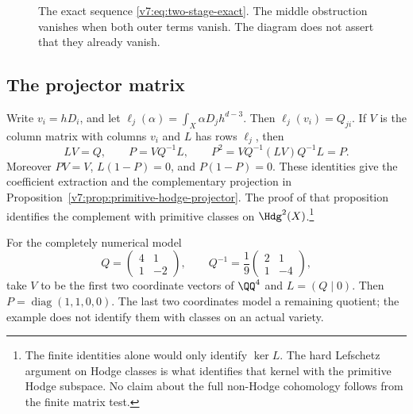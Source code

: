 \begin{figure}[ht]
\centering
{}
\caption{The exact sequence \eqref{v7:eq:two-stage-exact}.
The middle obstruction vanishes when both outer terms vanish.
The diagram does not assert that they already vanish.}
\label{v7:fig:two-defects}
\end{figure}

\subsection{The projector matrix}

Write \(v_i=hD_i\), and let
\(\ell_j(\alpha)=\int_X\alpha D_jh^{d-3}\). Then
\(\ell_j(v_i)=Q_{ji}\). If \(V\) is the column matrix with
columns \(v_i\) and \(L\) has rows \(\ell_j\), then
\[
 LV=Q,\qquad P=VQ^{-1}L,\qquad
 P^2=VQ^{-1}(LV)Q^{-1}L=P.
\]
Moreover \(PV=V\), \(L(1-P)=0\), and \(P(1-P)=0\).
These identities give the coefficient extraction and the complementary
projection in Proposition~\ref{v7:prop:primitive-hodge-projector}.
The proof of that proposition identifies the complement with primitive
classes on \(\Hdg^2(X)\).\footnote{The finite identities alone
would only identify \(\ker L\). The hard Lefschetz argument on
Hodge classes is what identifies that kernel with the primitive
Hodge subspace. No claim about the full non-Hodge cohomology follows
from the finite matrix test.}

For the completely numerical model
\[
 Q=\begin{pmatrix}4&1\\1&-2\end{pmatrix},\qquad
 Q^{-1}=\frac19\begin{pmatrix}2&1\\1&-4\end{pmatrix},
\]
take \(V\) to be the first two coordinate vectors of \(\QQ^4\)
and \(L=(Q\mid 0)\). Then \(P=\operatorname{diag}(1,1,0,0)\).
The last two coordinates model a remaining quotient; the example
does not identify them with classes on an actual variety.

